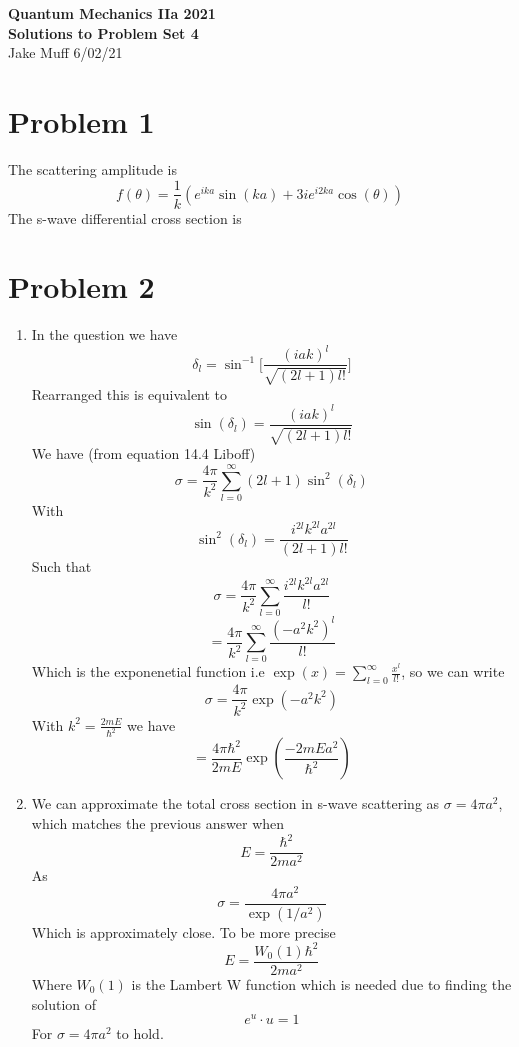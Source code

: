\documentclass[12pt]{article}
\begin{document}
\normalsize

\baselineskip 14pt

\begin{center}
{\Large {\bf Quantum Mechanics IIa 2021 \ \ \\ Solutions to Problem Set 4}} \\
Jake Muff
6/02/21
\end{center}
\section*{Problem 1}
The scattering amplitude is 
$$ f(\theta) = \frac{1}{k} (e^{ika} \sin (ka) + 3i e^{i2ka} \cos(\theta)) $$
The s-wave differential cross section is 

\section*{Problem 2} 
\begin{enumerate}
    \item %
    In the question we have 
    $$ \delta_l = \sin^{-1} \Big[ \frac{(iak)^l}{\sqrt{(2l+1)l!}}\Big] $$
    Rearranged this is equivalent to 
    $$ \sin (\delta_l)  = \frac{(iak)^l}{\sqrt{(2l+1)l!}} $$
    We have (from equation 14.4 Liboff) 
    $$ \sigma = \frac{4 \pi}{k^2} \sum_{l=0}^{\infty} (2l+1) \sin^2 (\delta_l) $$
    With
    $$ \sin^2 (\delta_l) = \frac{i^{2l} k^{2l} a^{2l}}{(2l+1)l!} $$
    Such that 
    $$ \sigma = \frac{4 \pi }{k^2} \sum_{l=0}^{\infty} \frac{i^{2l} k^{2l} a^{2l} }{l!} $$
    $$ = \frac{4 \pi}{k^2} \sum_{l=0}^{\infty} \frac{(-a^2 k^2)^l}{l!} $$
    Which is the exponenetial function i.e $\exp(x) = \sum_{l=0}^{\infty} \frac{x^l}{l!} $, so we can write 
    $$ \sigma = \frac{4 \pi}{k^2} \exp(-a^2 k^2) $$
    With $k^2 = \frac{2mE}{\hbar^2} $ we have 
    $$ = \frac{4 \pi \hbar^2}{2mE} \exp(\frac{-2mE a^2}{\hbar^2}) $$

    \item We can approximate the total cross section in s-wave scattering as $\sigma = 4 \pi a^2$, which matches
    the previous answer when 
    $$ E = \frac{\hbar^2}{2 m a^2} $$ 
    As 
    $$ \sigma = \frac{4 \pi a^2}{\exp(1/a^2)} $$
    Which is approximately close. To be more precise 
    $$ E = \frac{W_0(1) \hbar^2}{2ma^2} $$
    Where $W_0(1)$ is the Lambert W function which is needed due to finding the solution of 
    $$ e^u \cdot u = 1$$
    For $\sigma=4 \pi a^2$ to hold. 
\end{enumerate}
\end{document}
